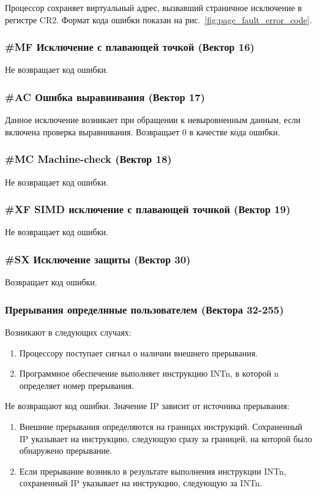 Процессор сохраняет виртуальный адрес, вызвавший страничное
исключение в регистре CR2. Формат кода ошибки показан на
рис.~\ref{fig:page_fault_error_code}.

\subsubsection*{\#MF Исключение с плавающей точкой (Вектор 16)}
Не возвращает код ошибки.

\subsubsection*{\#AC Ошибка выравнивания (Вектор 17)}
Данное исключение возникает при обращении к невыровненным данным, если
включена проверка выравнивания. Возвращает 0 в качестве кода ошибки.

\subsubsection*{\#MC Machine-check (Вектор 18)}
Не возвращает код ошибки.

\subsubsection*{\#XF SIMD исключение с плавающей точнкой (Вектор 19)}
Не возвращает код ошибки.

\subsubsection*{\#SX Исключение защиты (Вектор 30)}
Возвращает код ошибки.

\subsubsection*{Прерывания определнные пользователем (Вектора 32-255)}
Возникают в следующих случаях:
\begin{enumerate}
\item Процессору поступает сигнал о наличии внешнего прерывания.
\item Программное обеспечение выполняет инструкцию INTn, в которой n
определяет номер прерывания.
\end{enumerate}

Не возвращают код ошибки. Значение IP зависит от источника прерывания:
\begin{enumerate}
\item Внешние прерывания определяются на границах инструкций. Сохраненный IP
указывает на инструкцию, следующую сразу за границей, на которой было
обнаружено прерывание.
\item Если прерывание возникло в результате выполнения инструкции INTn,
сохраненный IP указывает на инструкцию, следующую за INTn.
\end{enumerate}

